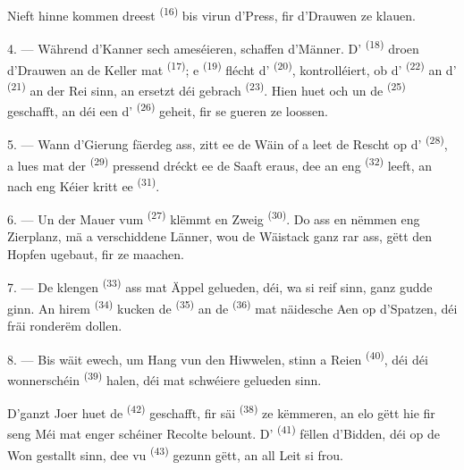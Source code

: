 Nieft hinne kommen dreest  \textsuperscript{(16)} bis virun d'Press,
fir d'Drauwen ze klauen.

4. --- Während d'Kanner sech ameséieren, schaffen d'Männer. D'
\textsuperscript{(18)} droen d'Drauwen an de Keller mat 
\textsuperscript{(17)}; e  \textsuperscript{(19)} flécht
d' \textsuperscript{(20)}, kontrolléiert, ob d'
\textsuperscript{(22)} an d' \textsuperscript{(21)} an der Rei sinn, an
ersetzt déi gebrach  \textsuperscript{(23)}. Hien huet och un de
 \textsuperscript{(25)} geschafft, an déi een d'
\textsuperscript{(26)} geheit, fir se gueren ze loossen.

5. --- Wann d'Gierung fäerdeg ass, zitt ee de Wäin of a leet de Rescht op
d' \textsuperscript{(28)}, a lues mat der 
\textsuperscript{(29)} pressend dréckt ee de Saaft eraus, dee an eng
 \textsuperscript{(32)} leeft, an nach eng Kéier kritt ee
 \textsuperscript{(31)}.

\VUsaut{6.0mm}
\VUsaut{3.4mm}

6. --- Un der Mauer vum  \textsuperscript{(27)} klëmmt en Zweig
 \textsuperscript{(30)}. Do ass en nëmmen eng Zierplanz, mä a
verschiddene Länner, wou de Wäistack ganz rar ass, gëtt den Hopfen ugebaut, fir
 ze maachen.

7. --- De klengen  \textsuperscript{(33)} ass mat Äppel gelueden, déi,
wa si reif sinn, ganz gudde  ginn. An hirem 
\textsuperscript{(34)} kucken de  \textsuperscript{(35)} an de
 \textsuperscript{(36)} mat näidesche Aen op d'Spatzen, déi fräi
ronderëm dollen.

8. --- Bis wäit ewech, um Hang vun den Hiwwelen, stinn a Reien
 \textsuperscript{(40)}, déi déi wonnerschéin
 \textsuperscript{(39)} halen, déi mat schwéiere 
gelueden sinn.

D'ganzt Joer huet de  \textsuperscript{(42)} geschafft, fir säi
 \textsuperscript{(38)} ze këmmeren, an elo gëtt hie fir seng Méi mat
enger schéiner Recolte belount. D' \textsuperscript{(41)} fëllen
d'Bidden, déi op de Won gestallt sinn, dee vu  \textsuperscript{(43)}
gezunn gëtt, an all Leit si frou.

